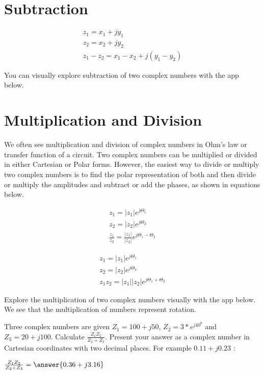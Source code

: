 \documentclass{ximera}
\begin{document}
\section{Subtraction}


\begin{eqnarray}
z_1=x_1 + j y_1 \nonumber \\
z_2=x_2 + j y_2 \nonumber \\
z_1-z_2 = x_1 - x_2 + j ( y_1 - y_2)
\end{eqnarray} 


You can visually explore subtraction of two complex numbers with the app below.
 \begin{center}  
\end{center} 

\section{Multiplication and Division}

We often see multiplication and division of complex numbers in  Ohm's law or transfer function of a circuit. Two complex numbers can be multiplied or divided in either Cartesian or Polar forms. However, the easiest way to divide or multiply two complex numbers is to find the polar representation of both and then divide or multiply the amplitudes and subtract or add the phases, as shown in equations below.



\begin{eqnarray}
z_1=|z_1| e^{j \Theta_1} \nonumber \\ 
z_2=|z_2| e^{j \Theta_2} \nonumber \\
\frac{z_1}{ z_2} = \frac{|z_1|}{|z_2|} e^{j \Theta_1 -\Theta_2}
\end{eqnarray}
  

\begin{eqnarray}
z_1=|z_1| e^{j \Theta_1} \nonumber \\
z_2=|z_2| e^{j \Theta_2} \nonumber \\
z_1 z_2 = |z_1||z_2| e^{j \Theta_1 +\Theta_2}
\end{eqnarray}



Explore the multiplication of two complex numbers visually with the app below. We see that the multiplication of numbers represent rotation.

    
   
 \begin{center}  
\end{center} 
    
    
\begin{question}
Three complex numbers are given $Z_1=100+j50$, $Z_2=3*e^{j40^0}$ and  $Z_3=20+j100$. Calculate $\frac{Z_1 Z_2}{Z_2+Z_3}$. Present your answer as a complex number in Cartesian coordinates with two decimal places. For example $0.11+j0.23$ :
  
$\frac{Z_1 Z_2}{Z_2+Z_3} = \answer{0.36+j3.16}$  
\end{question} 
\end{document}
